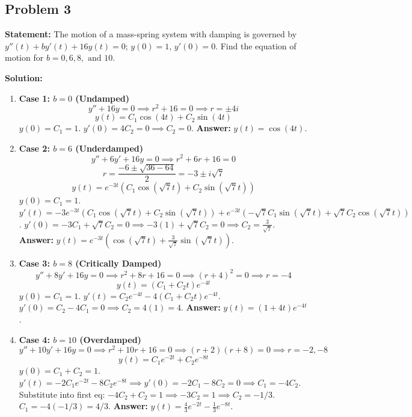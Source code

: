 \documentclass[11pt]{article}
\begin{document}
\subsection{Problem 3}
\textbf{Statement:} The motion of a mass-spring system with damping is governed by $y''(t) + by'(t) + 16y(t) = 0$; $y(0) = 1$, $y'(0) = 0$. Find the equation of motion for $b = 0, 6, 8, \text{ and } 10$.

\textbf{Solution:}
\begin{enumerate}
    \item \textbf{Case 1: $b = 0$ (Undamped)}
    \[ y'' + 16y = 0 \implies r^2 + 16 = 0 \implies r = \pm 4i \]
    \[ y(t) = C_1 \cos(4t) + C_2 \sin(4t) \]
    $y(0) = C_1 = 1$. $y'(0) = 4C_2 = 0 \implies C_2 = 0$.
    \textbf{Answer:} $y(t) = \cos(4t)$.
    
    \item \textbf{Case 2: $b = 6$ (Underdamped)}
    \[ y'' + 6y' + 16y = 0 \implies r^2 + 6r + 16 = 0 \]
    \[ r = \frac{-6 \pm \sqrt{36 - 64}}{2} = -3 \pm i\sqrt{7} \]
    \[ y(t) = e^{-3t}(C_1 \cos(\sqrt{7}t) + C_2 \sin(\sqrt{7}t)) \]
    $y(0) = C_1 = 1$.
    $y'(t) = -3e^{-3t}(C_1 \cos(\sqrt{7}t) + C_2 \sin(\sqrt{7}t)) + e^{-3t}(-\sqrt{7}C_1 \sin(\sqrt{7}t) + \sqrt{7}C_2 \cos(\sqrt{7}t))$.
    $y'(0) = -3C_1 + \sqrt{7}C_2 = 0 \implies -3(1) + \sqrt{7}C_2 = 0 \implies C_2 = \frac{3}{\sqrt{7}}$.
    \textbf{Answer:} $y(t) = e^{-3t}\left(\cos(\sqrt{7}t) + \frac{3}{\sqrt{7}}\sin(\sqrt{7}t)\right)$.
    
    \item \textbf{Case 3: $b = 8$ (Critically Damped)}
    \[ y'' + 8y' + 16y = 0 \implies r^2 + 8r + 16 = 0 \implies (r+4)^2 = 0 \implies r = -4 \]
    \[ y(t) = (C_1 + C_2 t)e^{-4t} \]
    $y(0) = C_1 = 1$.
    $y'(t) = C_2 e^{-4t} - 4(C_1 + C_2 t)e^{-4t}$.
    $y'(0) = C_2 - 4C_1 = 0 \implies C_2 = 4(1) = 4$.
    \textbf{Answer:} $y(t) = (1 + 4t)e^{-4t}$.
    
    \item \textbf{Case 4: $b = 10$ (Overdamped)}
    \[ y'' + 10y' + 16y = 0 \implies r^2 + 10r + 16 = 0 \implies (r+2)(r+8) = 0 \implies r = -2, -8 \]
    \[ y(t) = C_1 e^{-2t} + C_2 e^{-8t} \]
    $y(0) = C_1 + C_2 = 1$.
    $y'(t) = -2C_1 e^{-2t} - 8C_2 e^{-8t} \implies y'(0) = -2C_1 - 8C_2 = 0 \implies C_1 = -4C_2$.
    Substitute into first eq: $-4C_2 + C_2 = 1 \implies -3C_2 = 1 \implies C_2 = -1/3$.
    $C_1 = -4(-1/3) = 4/3$.
    \textbf{Answer:} $y(t) = \frac{4}{3}e^{-2t} - \frac{1}{3}e^{-8t}$.
\end{enumerate}
\end{document}
